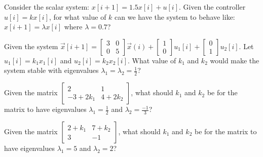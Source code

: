 
\begin{enumerate}

\qitem Consider the scalar system: $x[i+1] = 1.5 x[i] + u[i]$. Given the controller $u[i] = k x[i]$, for what value of $k$ can we have the system to behave like:$x[i+1] = \lambda x[i]$ where $\lambda = 0.7$?



\qitem Given the system $\vec{x}[i+1]  = \left [ \begin{array}{cc} 3&0\\0&5 \end{array}\right] \vec{x}(i) + \left[\begin{array}{c}1\\0 \end{array}\right] u_1[i]+ \left[\begin{array}{c}0\\1 \end{array}\right] u_2[i]$.
Let $u_1[i] = k_1 x_1[i]$ and $u_2[i] = k_2 x_2[i]$. What value of $k_1$ and $k_2$ would make the system stable with eigenvalues $\lambda_1 = \lambda_2 = \frac{1}{2}$?











\qitem Given the matrix $\begin{bmatrix}
2  & 1 \\
-3 + 2k_1 & 4+2k_2
\end{bmatrix}$,
what should $k_1$ and $k_2$ be for the matrix to have eigenvalues $\lambda_1=\frac{1}{2}$ and $\lambda_2=\frac{-1}{3}$?







\qitem Given the matrix $\begin{bmatrix}
2+ k_1  & 7 +k_2 \\
3 & -1
\end{bmatrix}$,
what should $k_1$ and $k_2$ be for the matrix to have eigenvalues $\lambda_1=5$ and $\lambda_2=2$?









\end{enumerate}
